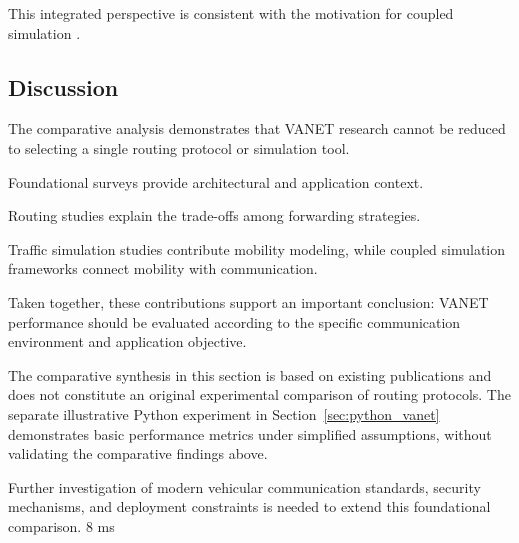 This integrated
perspective is
consistent with
the motivation
for coupled
simulation
\cite{Sommer2011}.

\subsection{Discussion}

The comparative
analysis demonstrates
that VANET research
cannot be reduced
to selecting a
single routing
protocol or
simulation tool.

Foundational surveys
provide architectural
and application
context.

Routing studies
explain the
trade-offs among
forwarding strategies.

Traffic simulation
studies contribute
mobility modeling,
while coupled
simulation frameworks
connect mobility
with communication.

Taken together,
these contributions
support an important
conclusion: VANET
performance should
be evaluated
according to the
specific communication
environment and
application objective.

The comparative synthesis in
this section is based on
existing publications and
does not constitute an original
experimental comparison of
routing protocols. The separate
illustrative Python experiment
in Section~\ref{sec:python_vanet}
demonstrates basic performance
metrics under simplified
assumptions, without validating
the comparative findings above.

Further investigation
of modern vehicular
communication standards,
security mechanisms,
and deployment
constraints is
needed to extend
this foundational
comparison.
8 ms